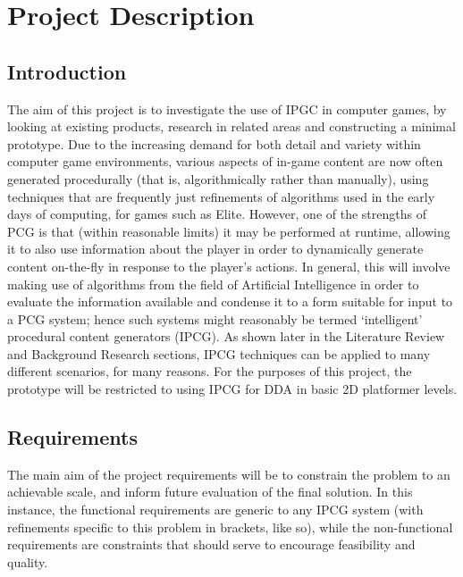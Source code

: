 \documentclass[a4paper,oneside,12pt,openany]{memoir}
\begin{document}
\tableofcontents*
\mainmatter
\chapter{Project Description}
\section{Introduction}
The aim of this project is to investigate the use of IPGC in computer games, by looking at existing products, research in related areas and constructing a minimal prototype. Due to the increasing demand for both detail and variety within computer game environments, various aspects of in-game content are now often generated procedurally (that is, algorithmically rather than manually), using techniques that are frequently just refinements of algorithms used in the early days of computing, for games such as Elite.%
However, one of the strengths of PCG is that (within reasonable limits) it may be performed at runtime, allowing it to also use information about the player in order to dynamically generate content on-the-fly in response to the player's actions. In general, this will involve making use of algorithms from the field of Artificial Intelligence in order to evaluate the information available and condense it to a form suitable for input to a PCG system; hence such systems might reasonably be termed `intelligent' procedural content generators (IPCG).
As shown later in the Literature Review and Background Research sections, IPCG techniques can be applied to many different scenarios, for many reasons. For the purposes of this project, the prototype will be restricted to using IPCG for DDA in basic 2D platformer levels. 
\newpage
\vspace*{1.3cm}
\section{Requirements}
The main aim of the project requirements will be to constrain the problem to an achievable scale, and inform future evaluation of the final solution. In this instance, the functional requirements are generic to any IPCG system (with refinements specific to this problem in brackets, like so), while the non-functional requirements are constraints that should serve to encourage feasibility and quality.
\end{document}
